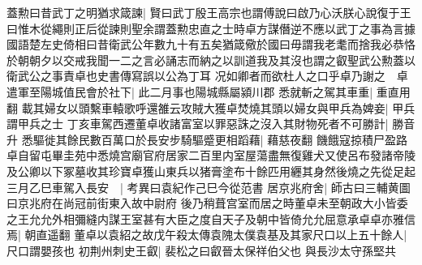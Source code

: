 蓋勲曰昔武丁之明猶求箴諫|{
	賢曰武丁殷王高宗也謂傅說曰啟乃心沃朕心說復于王曰惟木從繩則正后從諫則聖余謂蓋勲忠直之士時卓方謀僭逆不應以武丁之事為言據國語楚左史倚相曰昔衛武公年數九十有五矣猶箴儆於國曰毋謂我老耄而捨我必恭恪於朝朝夕以交戒我聞一二之言必誦志而納之以訓道我及其沒也謂之叡聖武公勲蓋以衛武公之事責卓也史書傳寫誤以公為丁耳}
况如卿者而欲杜人之口乎卓乃謝之　卓遣軍至陽城值民會於社下|{
	此二月事也陽城縣屬潁川郡}
悉就斬之駕其車重|{
	重直用翻}
載其婦女以頭繫車轅歌呼還雒云攻賊大獲卓焚燒其頭以婦女與甲兵為婢妾|{
	甲兵謂甲兵之士}
丁亥車駕西遷董卓收諸富室以罪惡誅之沒入其財物死者不可勝計|{
	勝音升}
悉驅徙其餘民數百萬口於長安步騎驅蹙更相蹈藉|{
	藉慈夜翻}
饑餓寇掠積尸盈路卓自留屯畢圭苑中悉燒宫廟官府居家二百里内室屋蕩盡無復雞犬又使呂布發諸帝陵及公卿以下冢墓收其珍寶卓獲山東兵以猪膏塗布十餘匹用纒其身然後燒之先從足起　三月乙巳車駕入長安　|{
	考異曰袁紀作己巳今從范書}
居京兆府舍|{
	師古曰三輔黄圖曰京兆府在尚冠前街東入故中尉府}
後乃稍葺宫室而居之時董卓未至朝政大小皆委之王允允外相彌縫内謀王室甚有大臣之度自天子及朝中皆倚允允屈意承卓卓亦雅信焉|{
	朝直遥翻}
董卓以袁紹之故戊午殺太傳袁隗太僕袁基及其家尺口以上五十餘人|{
	尺口謂嬰孩也}
初荆州刺史王叡|{
	裴松之曰叡晉太保祥伯父也}
與長沙太守孫堅共


